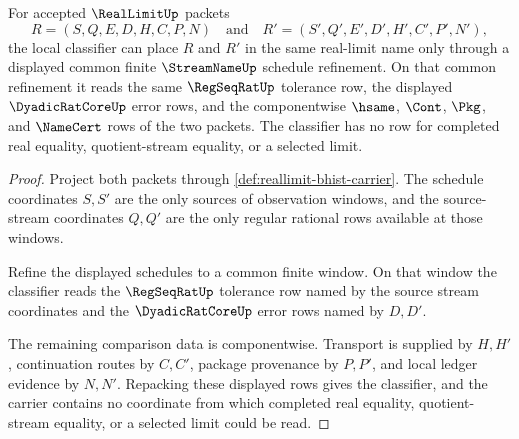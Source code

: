 \begin{theorem}
\label{thm:reallimit-common-refinement-classifier}
For accepted $\RealLimitUp$ packets
$$
R=(S,Q,E,D,H,C,P,N)
\quad\text{and}\quad
R'=(S',Q',E',D',H',C',P',N'),
$$
the local classifier can place $R$ and $R'$ in the same real-limit name only
through a displayed common finite $\StreamNameUp$ schedule refinement. On that
common refinement it reads the same $\RegSeqRatUp$ tolerance row, the displayed
$\DyadicRatCoreUp$ error rows, and the componentwise $\hsame$, $\Cont$,
$\Pkg$, and $\NameCert$ rows of the two packets. The classifier has no row for
completed real equality, quotient-stream equality, or a selected limit.
\end{theorem}
\begin{proof}
Project both packets through \autoref{def:reallimit-bhist-carrier}. The
schedule coordinates $S,S'$ are the only sources of observation windows, and
the source-stream coordinates $Q,Q'$ are the only regular rational rows
available at those windows.

Refine the displayed schedules to a common finite window. On that window the
classifier reads the $\RegSeqRatUp$ tolerance row named by the source stream
coordinates and the $\DyadicRatCoreUp$ error rows named by $D,D'$.

The remaining comparison data is componentwise. Transport is supplied by
$H,H'$, continuation routes by $C,C'$, package provenance by $P,P'$, and local
ledger evidence by $N,N'$. Repacking these displayed rows gives the classifier,
and the carrier contains no coordinate from which completed real equality,
quotient-stream equality, or a selected limit could be read.
\end{proof}

